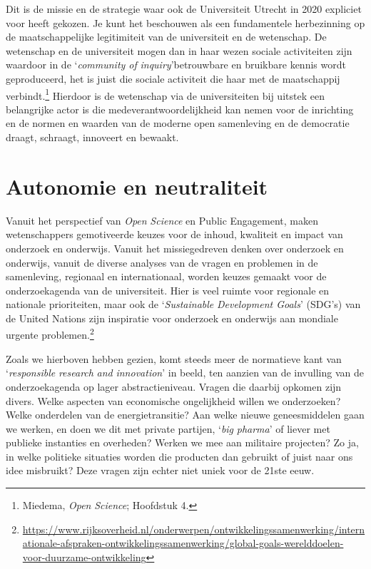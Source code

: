 \documentclass[smallauthor, chapterhaspagenum, nochapterinheader, pagenuminheader,  bigchapnum,medium2, tocpages,  garamond, titleinheader]{jote-book}
\begin{document}
	Dit is de missie en de strategie waar ook de Universiteit Utrecht in 2020 expliciet voor heeft gekozen. Je kunt het beschouwen als een fundamentele herbezinning op de maatschappelijke legitimiteit van de universiteit en de wetenschap. De wetenschap en de universiteit mogen dan in haar wezen sociale activiteiten zijn waardoor in de ‘\emph{community of }\emph{inquiry}'betrouwbare en bruikbare kennis wordt geproduceerd, het is juist die sociale activiteit die haar met de maatschappij verbindt.\footnote{Miedema, \emph{Open }\emph{Science}; Hoofdstuk 4.} Hierdoor is de wetenschap via de universiteiten bij uitstek een belangrijke actor is die medeverantwoordelijkheid kan nemen voor de inrichting en de normen en waarden van de moderne open samenleving en de democratie draagt, schraagt, innoveert en bewaakt.



	\section{Autonomie en neutraliteit}



	Vanuit het perspectief van \emph{Open }\emph{Science} en Public Engagement, maken wetenschappers gemotiveerde keuzes voor de inhoud, kwaliteit en impact van onderzoek en onderwijs. Vanuit het missiegedreven denken over onderzoek en onderwijs, vanuit de diverse analyses van de vragen en problemen in de samenleving, regionaal en internationaal, worden keuzes gemaakt voor de onderzoekagenda van de universiteit. Hier is veel ruimte voor regionale en nationale prioriteiten, maar ook de ‘\emph{Sustainable}\emph{ Development Goals}' (SDG's) van de United Nations zijn inspiratie voor onderzoek en onderwijs aan mondiale urgente problemen.\footnote{\href{https://www.rijksoverheid.nl/onderwerpen/ontwikkelingssamenwerking/internationale-afspraken-ontwikkelingssamenwerking/global-goals-werelddoelen-voor-duurzame-ontwikkeling}{https://www.rijksoverheid.nl/onderwerpen/ontwikkelingssamenwerking/internationale-afspraken-ontwikkelingssamenwerking/global-goals-werelddoelen-voor-duurzame-ontwikkeling}}



	Zoals we hierboven hebben gezien, komt steeds meer de normatieve kant van ‘\emph{responsible}\emph{ research }\emph{and}\emph{ }\emph{innovation}' in beeld, ten aanzien van de invulling van de onderzoekagenda op lager abstractieniveau. Vragen die daarbij opkomen zijn divers. Welke aspecten van economische ongelijkheid willen we onderzoeken? Welke onderdelen van de energietransitie? Aan welke nieuwe geneesmiddelen gaan we werken, en doen we dit met private partijen, ‘\emph{big }\emph{pharma}' of liever met publieke instanties en overheden? Werken we mee aan militaire projecten? Zo ja, in welke politieke situaties worden die producten dan gebruikt of juist naar ons idee misbruikt? Deze vragen zijn echter niet uniek voor de 21ste eeuw.
\end{document}
